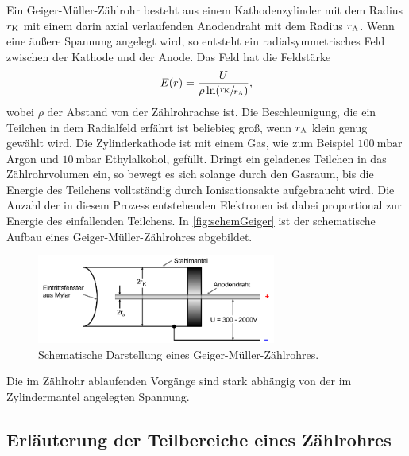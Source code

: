 Ein Geiger-Müller-Zählrohr besteht aus einem Kathodenzylinder mit dem Radius $r_{\text K}$ mit einem darin axial verlaufenden Anodendraht mit dem Radius $r_{\text A}$.
Wenn eine äußere Spannung angelegt wird, so entsteht ein radialsymmetrisches Feld zwischen der Kathode und der Anode.
Das Feld hat die Feldstärke
\begin{align}
    E(r)=\frac{U}{\rho\ln(\sfrac{r_{\text K}}{r_{\text A}})},
\end{align}
wobei $\rho$ der Abstand von der Zählrohrachse ist.
Die Beschleunigung, die ein Teilchen in dem Radialfeld erfährt ist beliebieg groß, wenn $r_{\text A}$ klein genug gewählt wird. \newline
Die Zylinderkathode ist mit einem Gas, wie zum Beispiel $\SI{100}{\milli\bar}$ Argon und $\SI{10}{\milli\bar}$ Ethylalkohol, gefüllt. Dringt ein geladenes Teilchen
in das Zählrohrvolumen ein, so bewegt es sich solange durch den Gasraum, bis die Energie des Teilchens volltständig durch Ionisationsakte aufgebraucht wird. Die Anzahl
der in diesem Prozess entstehenden Elektronen ist dabei proportional zur Energie des einfallenden Teilchens.
In \autoref{fig:schemGeiger} ist der schematische Aufbau eines Geiger-Müller-Zählrohres abgebildet.
\begin{figure}[H]
    \centering
    \includegraphics[width=0.7\textwidth]{data/zaehlrohr.png}
    \caption{Schematische Darstellung eines Geiger-Müller-Zählrohres.}
    \label{fig:schemGeiger}
\end{figure}

Die im Zählrohr ablaufenden Vorgänge sind stark abhängig von der im Zylindermantel angelegten Spannung.

\subsection{Erläuterung der Teilbereiche eines Zählrohres}
\label{subsec:erlVerlauf}


